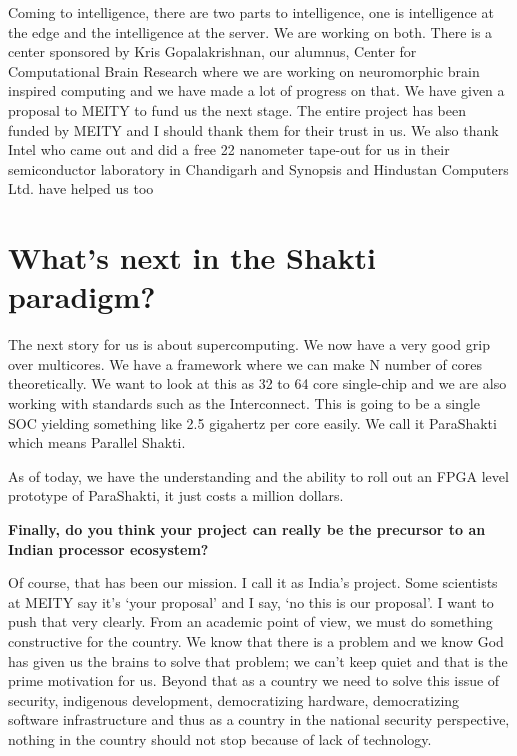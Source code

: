 \begin{multicols}{2}
Coming to intelligence, there are two parts to intelligence, one is intelligence at the edge and the intelligence at the server. We are working on both. There is a center sponsored by Kris Gopalakrishnan, our alumnus, Center for Computational Brain Research where we are working on neuromorphic brain inspired computing and we have made a lot of progress on that. We have given a proposal to MEITY to fund us the next stage. The entire project has been funded by MEITY and I should thank them for their trust in us. We also thank Intel who came out and did a free 22 nanometer tape-out for us in their semiconductor laboratory in Chandigarh and Synopsis and Hindustan Computers Ltd. have helped us too 

\section*{What's next in the Shakti paradigm?}

The next story for us is about supercomputing. We now have a very good grip over multicores. We have a framework where we can make N number of cores theoretically. We want to look at this as 32 to 64 core single-chip and we are also working with standards such as the Interconnect. This is going to be a single SOC yielding something like 2.5 gigahertz per core easily. We call it ParaShakti which means Parallel Shakti. 

As of today, we have the understanding and the ability to roll out an FPGA level prototype of ParaShakti, it just costs a million dollars.

\noindent
{\bf Finally, do you think your project can really be the precursor to an Indian processor ecosystem?}

  Of course, that has been our mission. I call it as India's project. Some scientists at MEITY say it's `your proposal' and I say, `no this is our proposal'. I want to push that very clearly. From an academic point of view, we must do something constructive for the country. We know that there is a problem and we know God has given us the brains to solve that problem; we can't keep quiet and that is the prime motivation for us. Beyond that as a country we need to solve this issue of security, indigenous development, democratizing hardware, democratizing software infrastructure and thus as a country in the national security perspective, nothing in the country should not stop because of lack of technology.
\end{multicols}
